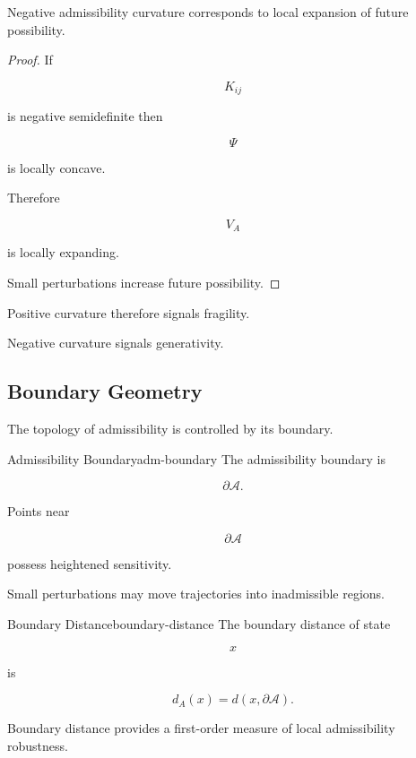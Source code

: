 \documentclass[12pt,twoside,openright]{book}
\newenvironment{prop}
{\begin{proposition}{}{}}
{\end{proposition}}
\begin{document}
\begin{prop}
Negative admissibility curvature corresponds to local
expansion of future possibility.
\end{prop}

\begin{proof}
If

\[
K_{ij}
\]

is negative semidefinite then

\[
\Psi
\]

is locally concave.

Therefore

\[
V_A
\]

is locally expanding.

Small perturbations increase future possibility.
\end{proof}

Positive curvature therefore signals fragility.

Negative curvature signals generativity.

\subsection{Boundary Geometry}

The topology of admissibility is controlled by its
boundary.

\begin{definition}{Admissibility Boundary}{adm-boundary}
The admissibility boundary is

\[
\partial\mathcal A.
\]
\end{definition}

Points near

\[
\partial\mathcal A
\]

possess heightened sensitivity.

Small perturbations may move trajectories into
inadmissible regions.

\begin{definition}{Boundary Distance}{boundary-distance}
The boundary distance of state

\[
x
\]

is

\[
d_A(x)
=

d(x,\partial\mathcal A).
\]
\end{definition}

\begin{prop}
Boundary distance provides a first-order measure of local
admissibility robustness.
\end{prop}
\end{document}
